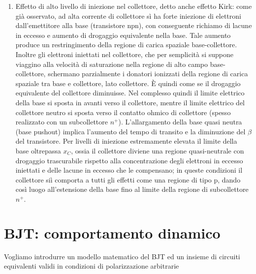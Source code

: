 \begin{enumerate}
\begin{enumerate}
    \item Effetto di alto livello di iniezione nel collettore, detto anche effetto Kirk: come già osservato, ad alta corrente di collettore sì ha forte iniezione di elettroni dall'emettitore alla base (transistore npn), con conseguente richiamo di lacune in eccesso e aumento di drogaggio equivalente nella base. Tale aumento produce un restringimento della regione di carica spaziale base-collettore. Inoltre gli elettroni iniettati nel collettore, che per semplicità si suppone viaggino alla velocità di saturazione nella regione di alto campo base-collettore, schermano parzialmente i donatori ionizzati della regione di carica spaziale tra base e collettore, lato collettore. È quindi come se il drogaggio equivalente del collettore diminuisse. Nel complesso quindi il limite elettrico della base si sposta in avanti verso il collettore, mentre il limite elettrico del collettore neutro si sposta verso il contatto ohmico di collettore (spesso realizzato con un subcollettore $n^+$). L'allargamento della base quasi neutra (base pushout) implica l'aumento del tempo di transito e la diminuzione del $\beta$ del transistore. Per livelli di iniezione estremamente elevata il limite della base oltrepassa $x_C$, ossia il collettore diviene una regione quasi-neutrale con drogaggio trascurabile rispetto alla concentrazione degli elettroni in eccesso iniettati e delle lacune in eccesso che le compensano; in queste condizioni il collettore siì comporta a tutti gli effetti come una regione di tipo p, dando così luogo all'estensione della base fino al limite della regione di subcollettore $n^+$.  
\end{enumerate}
\end{enumerate}
%


\cleardoublepage
\section{BJT: comportamento dinamico}
Vogliamo introdurre un modello matematico del BJT ed un insieme di circuiti equivalenti validi in condizioni di polarizzazione arbitrarie
